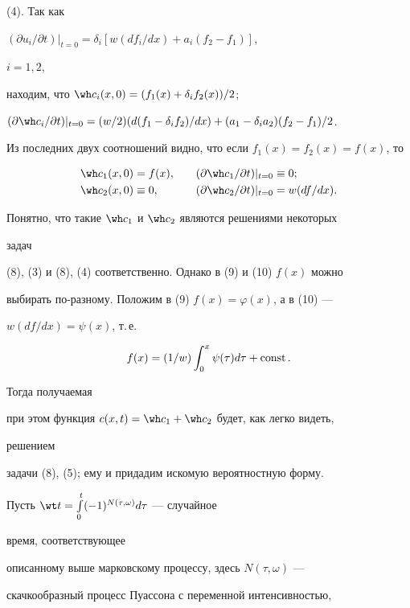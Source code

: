 (4). Так как 


$(\partial u_i/\partial t)|_{t=0}=\delta_i[w(d f_i/dx)+a_i(f_2-f_1)]$, 


$i=1,2$, 


находим, что $\wh c_i(x,0)=(f_1(x)+\delta_i f_2(x))/2$; 


$(\partial\wh c_i/\partial t)|_{t=0}=(w/2)(d(f_1-\delta_i f_2)/dx)+\linebreak


(a_1-\delta_i a_2)(f_2-f_1)/2$. 


Из последних двух соотношений видно, что если $f_1(x)=f_2(x)=f(x)$, то 


\begin{alignat}{2} 


\wh c_1(x,0)&=f(x), &\quad 


(\partial\wh c_1/\partial t)|_{t=0}&\equiv 0;\\ 


% 


\wh c_2(x,0)&\equiv 0, &\quad 


(\partial\wh c_2/\partial t)|_{t=0}&=w(d f/dx). 


\end{alignat} 


Понятно, что такие $\wh c_1$ и $\wh c_2$ являются решениями некоторых 


задач 


(8), (3) и (8), (4) соответственно. Однако в (9) и (10)\; $f(x)$ можно 


выбирать по-разному. Положим в (9)\; $f(x)=\varphi(x)$, а в (10) --- 


$w(d f/dx)=\psi(x)$, т.\,е. 


$$ 


f(x)=(1/w)\int^x_0\psi(\tau)d\tau+\const. 


$$ 


Тогда получаемая 


при этом функция $c(x,t)=\wh c_1+\wh c_2$ будет, как легко видеть, 


решением 


задачи (8), (5); ему и придадим искомую вероятностную форму. 


Пусть $\wt t=\int\limits^t_0(-1)^{N(\tau,\omega)}d\tau$ --- случайное 


время, соответствующее 


описанному выше марковскому процессу, здесь $N(\tau,\omega)$ --- 


скачкообразный процесс Пуассона с переменной интенсивностью, 



